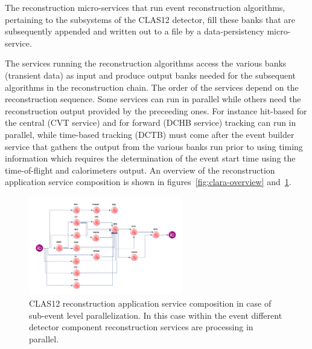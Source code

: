 \documentclass[3p,times,twocolumn]{elsarticle}
\begin{document}
The reconstruction micro-services that run event reconstruction algorithms, pertaining to
the subsystems of the CLAS12 detector, fill these banks
that are subsequently appended and written out to a file by a data-persistency micro-service.

The services running the reconstruction algorithms access the various banks (transient data) as input
and produce output banks needed for the subsequent algorithms in the reconstruction chain.
The order of the services depend on the reconstruction sequence.  Some services can run in parallel while others
need the reconstruction output provided by the preceeding ones.
For instance hit-based for the central (CVT service) and for forward (DCHB service) tracking
can run in parallel, while time-based tracking (DCTB) must come after the event builder service
that gathers the output from the various banks run prior to using timing information which requires
the determination of the event start time using the time-of-flight and calorimeters output.
An  overview of the reconstruction application service composition is shown in figures~\ref{fig:clara-overview} and~\ref{fig:services}.



\begin{figure}
\centering
\includegraphics[width=0.6\textwidth]{pics/ServiceComposition.png}
\caption{CLAS12 reconstruction application service composition in case of sub-event level parallelization.
In this case within the event different detector component reconstruction services are processing in parallel.}
\label{fig:services}
\end{figure}


\end{document}
